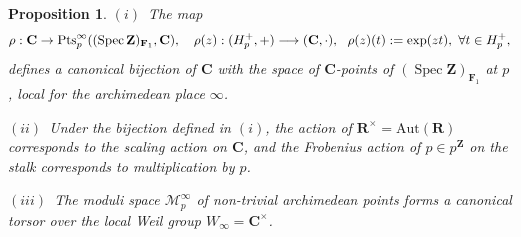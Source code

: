 \documentclass[11pt,a4paper]{article}
\newtheorem{proposition}[theorem]{Proposition}
\newcommand{\C}{\mathbf{C}}
\newcommand{\R}{\mathbf{R}}
\newcommand{\Z}{\mathbf{Z}}
\def\spzf{(\Spec \Z)_{\mathbf{F}_{1}}}
\newcommand{\Pt}{{\rm Pts}}
\newcommand{\Aut}{\mathrm{Aut}}
\newcommand{\Spec}{\operatorname{Spec}}
\begin{document}
\begin{proposition}\label{prop:archimedean_points_C}
$(i)$~The map 
\[
\rho:\C \to \Pt_p^\infty(\spzf,\C),\quad \rho(z) : (H_p^+, +) \longrightarrow (\C, \cdot), \ \ \rho(z)(t):=\exp(zt), \ \forall t \in H_p^+,
\] defines a canonical bijection of $\C$ with the  space of  $\C$-points of $\spzf$ at $p$, local for the archimedean place $\infty$.

$(ii)$~Under the bijection defined in $(i)$, the action of $\R^\times=\Aut(\R)$ corresponds to the scaling action on $\C$, and the Frobenius action of $p \in p^\Z$ on the stalk corresponds to multiplication by $p$.

$(iii)$~The moduli space $\mathcal{M}_{p}^{\infty}$ of non-trivial archimedean points  forms a canonical torsor over the local Weil group $W_\infty=\C^\times$.
\end{proposition}
\end{document}
